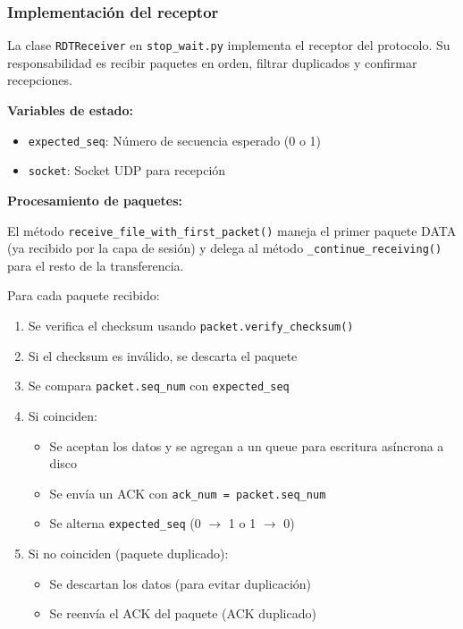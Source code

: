 \subsubsection{Implementación del receptor}

La clase \texttt{RDTReceiver} en \texttt{stop\_wait.py} implementa el receptor del protocolo. Su responsabilidad es recibir paquetes en orden, filtrar duplicados y confirmar recepciones.

\textbf{Variables de estado:}
\begin{itemize}
    \item \texttt{expected\_seq}: Número de secuencia esperado (0 o 1)
    \item \texttt{socket}: Socket UDP para recepción
\end{itemize}

\textbf{Procesamiento de paquetes:}

El método \texttt{receive\_file\_with\_first\_packet()} maneja el primer paquete DATA (ya recibido por la capa de sesión) y delega al método \texttt{\_continue\_receiving()} para el resto de la transferencia. 

Para cada paquete recibido:
\begin{enumerate}
    \item Se verifica el checksum usando \texttt{packet.verify\_checksum()}
    \item Si el checksum es inválido, se descarta el paquete
    \item Se compara \texttt{packet.seq\_num} con \texttt{expected\_seq}
    \item Si coinciden:
    \begin{itemize}
        \item Se aceptan los datos y se agregan a un queue para escritura asíncrona a disco
        \item Se envía un ACK con \texttt{ack\_num = packet.seq\_num}
        \item Se alterna \texttt{expected\_seq} (0 $\rightarrow$ 1 o 1 $\rightarrow$ 0)
    \end{itemize}
    \item Si no coinciden (paquete duplicado):
    \begin{itemize}
        \item Se descartan los datos (para evitar duplicación)
        \item Se reenvía el ACK del paquete (ACK duplicado)
    \end{itemize}
\end{enumerate}

